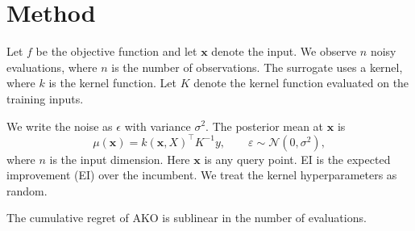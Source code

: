 \section{Method}
Let $f$ be the objective function and let $\mathbf{x}$ denote the input. We observe $n$ noisy evaluations,
where $n$ is the number of observations. The surrogate uses a kernel, where $k$ is the kernel function.
Let $K$ denote the kernel function evaluated on the training inputs.

We write the noise as $\epsilon$ with variance $\sigma^2$. The posterior mean at $\boldsymbol{x}$ is
\begin{equation}
  \mu(\mathbf{x}) = k(\mathbf{x}, X)^\top K^{-1} y, \qquad \varepsilon \sim \mathcal{N}(0, \sigma^2),
\end{equation}
where $n$ is the input dimension. Here $\bm{x}$ is any query point. EI is the expected improvement (EI) over the
incumbent. We treat the kernel hyperparameters as random.

\begin{theorem}\label{thm:regret}
The cumulative regret of AKO is sublinear in the number of evaluations.
\end{theorem}
